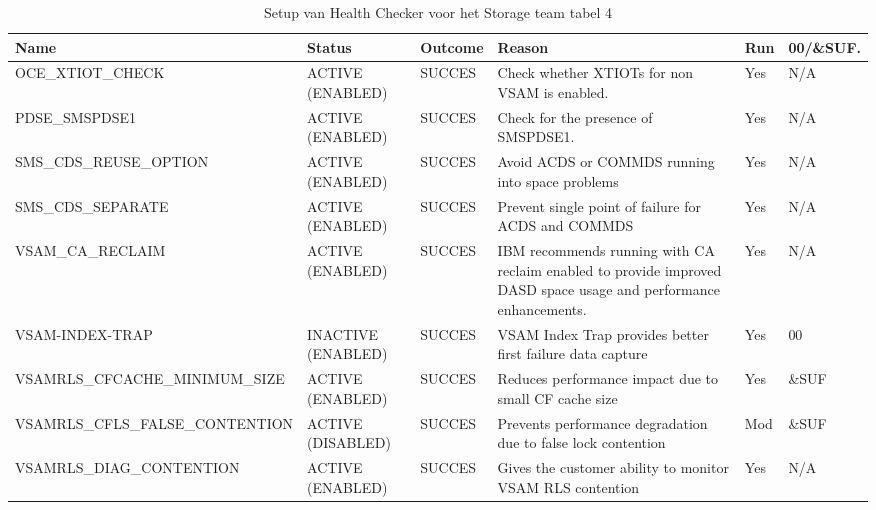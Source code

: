 \begin{landscape}
	\begin{table}[h]
		\begin{tabular}{|l|p{2.3cm}|l|p{4.5cm}|l|l|}
			\hline
			\textbf{Name}                       & \textbf{Status}   & \textbf{Outcome} & \textbf{Reason}    & \textbf{Run} &	\textbf{00/\&SUF.} \\ \hline
			OCE\_XTIOT\_CHECK                & ACTIVE (ENABLED)   & SUCCES & Check   whether XTIOTs for non VSAM is enabled.                                                                       & Yes & N/A   \\ \hline
			PDSE\_SMSPDSE1                   & ACTIVE (ENABLED)   & SUCCES & Check   for the presence of SMSPDSE1.                                                                                 & Yes & N/A   \\ \hline
			SMS\_CDS\_REUSE\_OPTION          & ACTIVE (ENABLED)   & SUCCES & Avoid   ACDS or COMMDS running into space problems                                                                    & Yes & N/A   \\ \hline
			SMS\_CDS\_SEPARATE               & ACTIVE (ENABLED)   & SUCCES & Prevent   single point of failure for ACDS and COMMDS                                                                 & Yes & N/A   \\ \hline
			VSAM\_CA\_RECLAIM                & ACTIVE (ENABLED)   & SUCCES & IBM   recommends running with CA reclaim enabled to provide improved DASD space   usage and performance enhancements. & Yes & N/A   \\ \hline
			VSAM-INDEX-TRAP                  & INACTIVE (ENABLED) & SUCCES & VSAM Index Trap provides better first failure data capture                                                            & Yes & 00    \\ \hline
			VSAMRLS\_CFCACHE\_MINIMUM\_SIZE  & ACTIVE (ENABLED)   & SUCCES & Reduces   performance impact due to small CF cache size                                                               & Yes & \&SUF \\ \hline
			VSAMRLS\_CFLS\_FALSE\_CONTENTION & ACTIVE (DISABLED)  & SUCCES & Prevents   performance degradation due to false lock contention                                                       & Mod & \&SUF \\ \hline
			VSAMRLS\_DIAG\_CONTENTION        & ACTIVE (ENABLED)   & SUCCES & Gives   the customer ability to monitor VSAM RLS contention                                                           & Yes & N/A   \\ \hline
		\end{tabular}
		\caption[Health Checker Storage team tabel 4]{Setup van Health Checker voor het Storage team tabel 4}
		\label{tbl:Storage Team Tabel 4}
	\end{table}
\end{landscape}

